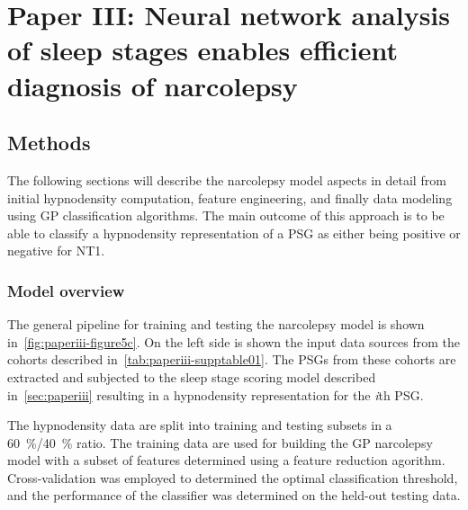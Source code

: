 \section{Paper III: Neural network analysis of sleep stages enables efficient diagnosis of narcolepsy}\label{sec:paperiii-narcolepsy}


\subsection{Methods}

The following sections will describe the narcolepsy model aspects in detail from initial hypnodensity computation, feature engineering, and finally data modeling using \ac{GP} classification algorithms.
The main outcome of this approach is to be able to classify a hypnodensity representation of a \ac{PSG} as either being positive or negative for \ac{NT1}.

\subsubsection{Model overview}

The general pipeline for training and testing the narcolepsy model is shown in~\cref{fig:paperiii-figure5c}.
On the left side is shown the input data sources from the cohorts described in~\cref{tab:paperiii-supptable01}.
The \acp{PSG} from these cohorts are extracted and subjected to the sleep stage scoring model described in~\cref{sec:paperiii} resulting in a hypnodensity representation for the \textit{i}th \ac{PSG}.

The hypnodensity data are split into training and testing subsets in a \SI{60}{\percent}/\SI{40}{\percent} ratio.
The training data are used for building the \ac{GP} narcolepsy model with a subset of features determined using a feature reduction agorithm.
Cross-validation was employed to determined the optimal classification threshold, and the performance of the classifier was determined on the held-out testing data.

